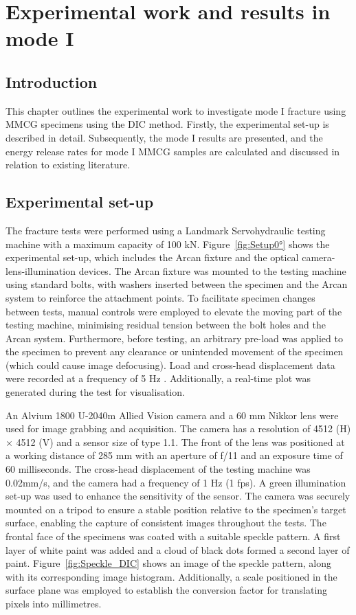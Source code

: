 \chapter{Experimental work and results in mode I}
\label{Chapter3}

\section{Introduction}

This chapter outlines the experimental work to investigate mode I fracture using MMCG specimens using the DIC method. Firstly, the experimental set-up is described in detail. Subsequently, the mode I results are presented, and the energy release rates for mode I MMCG samples are calculated and discussed in relation to existing literature.

\section{Experimental set-up}

The fracture tests were performed using a Landmark Servohydraulic testing machine with a maximum capacity of 100 kN. Figure~\ref{fig:Setup0°} shows the experimental set-up, which includes the Arcan fixture and the optical camera-lens-illumination devices. The Arcan fixture was mounted to the testing machine using standard bolts, with washers inserted between the specimen and the Arcan system to reinforce the attachment points. To facilitate specimen changes between tests, manual controls were employed to elevate the moving part of the testing machine, minimising residual tension between the bolt holes and the Arcan system. Furthermore, before testing, an arbitrary pre-load was applied to the specimen to prevent any clearance or unintended movement of the specimen (which could cause image defocusing). Load and cross-head displacement data were recorded at a frequency of 5 Hz . Additionally, a real-time plot was generated during the test for visualisation.


An Alvium 1800 U-2040m Allied Vision camera and a 60 mm Nikkor lens were used for image grabbing and acquisition. The camera has a resolution of 4512 (H) $\times$ 4512 (V) and a sensor size of type 1.1. The front of the lens was positioned at a working distance of 285 mm with an aperture of f/11 and an exposure time of 60 milliseconds. The cross-head displacement of the testing machine was 0.02mm/s, and the camera had a frequency of 1 Hz (1 fps).
 A green illumination set-up was used to enhance the sensitivity of the sensor. The camera was securely mounted on a tripod to ensure a stable position relative to the specimen's target surface, enabling the capture of consistent images throughout the tests. The frontal face of the specimens was coated with a suitable speckle pattern. A first layer of white paint was added and a cloud of black dots formed a second layer of paint. Figure~\ref{fig:Speckle_DIC} shows an image of the speckle pattern, along with its corresponding image histogram. Additionally, a scale positioned in the surface plane was employed to establish the conversion factor for translating pixels into millimetres.


